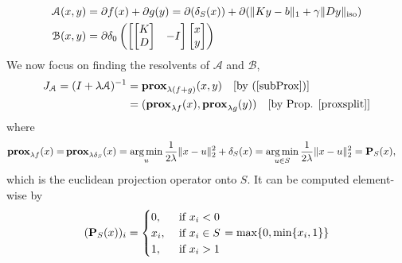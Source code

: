 \documentclass{article}
\theoremstyle{definition}
\theoremstyle{remark}
\begin{document}
  \begin{equation}
    \begin{split}
      \mathcal{A}(x,y)& = \partial f(x) + \partial g(y) = \partial (\delta_S (x)) +\partial (\|Ky - b\|_1 + \gamma \|Dy\|_{\operatorname{{iso}}})\\ 
      \mathcal{B}(x,y) &= \partial \delta_0 \left( \begin{bmatrix}
        \begin{bmatrix}
          K \\D
        \end{bmatrix} & -I
      \end{bmatrix} \begin{bmatrix}
        x\\y
      \end{bmatrix} \right)
    \end{split}
  \end{equation}
  We now focus on finding the resolvents of $\mathcal{A}$ and $\mathcal{B}$,  
  \begin{equation}
    \begin{split}
      J_{\mathcal{A}} = (I + \lambda \mathcal{A})^{-1} &= \operatorname{\mathbf{prox}}_{\lambda (f+g) }(x,y)\quad [\text{by (\ref{subProx})}] \\
      &= (\operatorname{\mathbf{prox}}_{\lambda f}(x) ,\operatorname{\mathbf{prox}}_{\lambda g}(y))\quad [\text{by Prop. \ref{proxsplit}}]
    \end{split}
  \end{equation}
  where 
  \begin{equation}
    \begin{split}
      \operatorname{\mathbf{prox}}_{\lambda f} (x) =& \operatorname{\mathbf{prox}}_{\lambda \delta_S}(x) = \operatorname*{{arg\,min}}_u \frac{1}{2\lambda} \| x-u \|^2_2 + \delta_S(x)= \operatorname*{{arg\,min}}_{u \in S} \frac{1}{2\lambda} \| x-u \|^2_2 =  \operatorname{\mathbf{P}}_S(x),
    \end{split}
  \end{equation}
  which is the euclidean projection operator onto $S.$ It can be computed element-wise by
  \begin{equation}
    \begin{split}
      (\operatorname{\mathbf{P}}_S(x))_i = 
      \begin{cases}
        0, &\text{ if } x_i < 0\\
        x_i, &\text{ if } x_i \in S\\ 
        1, & \text{ if } x_i > 1 
      \end{cases} = \max \{0 , \min\{x_i , 1\}\}
          \end{split}
  \end{equation}
\end{document}
